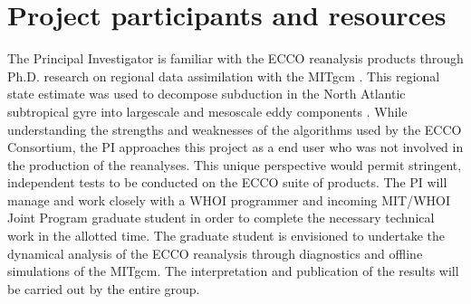 \documentclass[authoryear,round,12pt]{article}
\begin{document}






\section{Project participants and resources}
\label{sec:proj-management}

The Principal Investigator is familiar with the ECCO reanalysis products through Ph.D. research on regional data assimilation with the MITgcm \citep{Gebbie-Heimbach-2006:Strategies}. This regional state estimate was used to decompose subduction in the North Atlantic subtropical gyre into largescale and mesoscale eddy components \citep{Gebbie--2007:Does}. While understanding the strengths and weaknesses of the algorithms used by the ECCO Consortium, the PI approaches this project as a end user who was not involved in the production of the reanalyses. This unique perspective would permit stringent, independent tests to be conducted on the ECCO suite of products. The PI will manage and work closely with a WHOI programmer and incoming MIT/WHOI Joint Program graduate student in order to complete the necessary technical work in the allotted time. The graduate student is envisioned to undertake the dynamical analysis of the ECCO reanalysis through diagnostics and offline simulations of the MITgcm. The interpretation and publication of the results will be carried out by the entire group.
\end{document}

